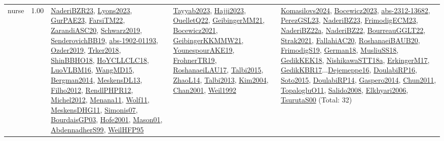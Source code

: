 {\begin{longtable}{p{3cm}r>{\raggedright\arraybackslash}p{6cm}>{\raggedright\arraybackslash}p{6cm}>{\raggedright\arraybackslash}p{8cm}}
\index{nurse}\index{ApplicationAreas!nurse}nurse &  1.00 & \hyperref[detail:NaderiBZR23]{NaderiBZR23}, \hyperref[detail:Lyons2023]{Lyons2023}, \hyperref[detail:GurPAE23]{GurPAE23}, \hyperref[detail:FarsiTM22]{FarsiTM22}, \hyperref[detail:ZarandiASC20]{ZarandiASC20}, \hyperref[detail:Schwarz2019]{Schwarz2019}, \hyperref[detail:SenderovichBB19]{SenderovichBB19}, \hyperref[detail:abs-1902-01193]{abs-1902-01193}, \hyperref[detail:Ozder2019]{Ozder2019}, \hyperref[detail:Trker2018]{Trker2018}, \hyperref[detail:ShinBBHO18]{ShinBBHO18}, \hyperref[detail:HoYCLLCLC18]{HoYCLLCLC18}, \hyperref[detail:LuoVLBM16]{LuoVLBM16}, \hyperref[detail:WangMD15]{WangMD15}, \hyperref[detail:Bergman2014]{Bergman2014}, \hyperref[detail:MeskensDL13]{MeskensDL13}, \hyperref[detail:Filho2012]{Filho2012}, \hyperref[detail:RendlPHPR12]{RendlPHPR12}, \hyperref[detail:Michel2012]{Michel2012}, \hyperref[detail:Menana11]{Menana11}, \hyperref[detail:Wolf11]{Wolf11}, \hyperref[detail:MeskensDHG11]{MeskensDHG11}, \hyperref[detail:Simonis07]{Simonis07}, \hyperref[detail:BourdaisGP03]{BourdaisGP03}, \hyperref[detail:Hofe2001]{Hofe2001}, \hyperref[detail:Mason01]{Mason01}, \hyperref[detail:AbdennadherS99]{AbdennadherS99}, \hyperref[detail:WeilHFP95]{WeilHFP95} & \hyperref[detail:Tayyab2023]{Tayyab2023}, \hyperref[detail:Hajji2023]{Hajji2023}, \hyperref[detail:OuelletQ22]{OuelletQ22}, \hyperref[detail:GeibingerMM21]{GeibingerMM21}, \hyperref[detail:Bocewicz2021]{Bocewicz2021}, \hyperref[detail:GeibingerKKMMW21]{GeibingerKKMMW21}, \hyperref[detail:YounespourAKE19]{YounespourAKE19}, \hyperref[detail:FrohnerTR19]{FrohnerTR19}, \hyperref[detail:RoshanaeiLAU17]{RoshanaeiLAU17}, \hyperref[detail:Talbi2015]{Talbi2015}, \hyperref[detail:ZhaoL14]{ZhaoL14}, \hyperref[detail:Talbi2013]{Talbi2013}, \hyperref[detail:Kim2004]{Kim2004}, \hyperref[detail:Chan2001]{Chan2001}, \hyperref[detail:Weil1992]{Weil1992} & \hyperref[detail:Komasilovs2024]{Komasilovs2024}, \hyperref[detail:Bocewicz2023]{Bocewicz2023}, \hyperref[detail:abs-2312-13682]{abs-2312-13682}, \hyperref[detail:PerezGSL23]{PerezGSL23}, \hyperref[detail:NaderiBZ23]{NaderiBZ23}, \hyperref[detail:FrimodigECM23]{FrimodigECM23}, \hyperref[detail:NaderiBZ22a]{NaderiBZ22a}, \hyperref[detail:NaderiBZ22]{NaderiBZ22}, \hyperref[detail:BourreauGGLT22]{BourreauGGLT22}, \hyperref[detail:Strak2021]{Strak2021}, \hyperref[detail:FallahiAC20]{FallahiAC20}, \hyperref[detail:RoshanaeiBAUB20]{RoshanaeiBAUB20}, \hyperref[detail:FrimodigS19]{FrimodigS19}, \hyperref[detail:German18]{German18}, \hyperref[detail:MusliuSS18]{MusliuSS18}, \hyperref[detail:GedikKEK18]{GedikKEK18}, \hyperref[detail:NishikawaSTT18a]{NishikawaSTT18a}, \hyperref[detail:ErkingerM17]{ErkingerM17}, \hyperref[detail:GedikKBR17]{GedikKBR17}...\hyperref[detail:Dejemeppe16]{Dejemeppe16}, \hyperref[detail:DoulabiRP16]{DoulabiRP16}, \hyperref[detail:Soto2015]{Soto2015}, \hyperref[detail:DoulabiRP14]{DoulabiRP14}, \hyperref[detail:Gaspero2014]{Gaspero2014}, \hyperref[detail:Chun2011]{Chun2011}, \hyperref[detail:TopalogluO11]{TopalogluO11}, \hyperref[detail:Salido2008]{Salido2008}, \hyperref[detail:Elkhyari2006]{Elkhyari2006}, \hyperref[detail:TsurutaS00]{TsurutaS00} (Total: 32)\\

\end{longtable}}
